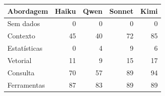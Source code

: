 \begin{tabular}{lrrrr}
\toprule
Abordagem & Haiku & Qwen & Sonnet & Kimi \\
\midrule
Sem dados & 0 & 0 & 0 & 0 \\
Contexto & 45 & 40 & 72 & 85 \\
Estatísticas & 0 & 4 & 9 & 6 \\
Vetorial & 11 & 9 & 15 & 17 \\
Consulta & 70 & 57 & 89 & 94 \\
Ferramentas & 87 & 83 & 89 & 89 \\
\bottomrule
\end{tabular}
